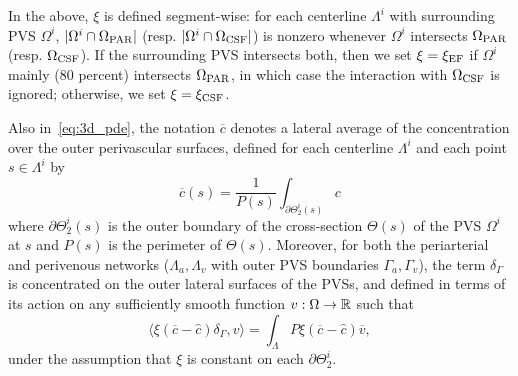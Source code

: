 \documentclass[fleqn,10pt]{wlscirep}
\begin{document}
In the above, $\xi$ is defined segment-wise: for each centerline $\Lambda^i$ with surrounding PVS $\Omega^i$, $|\Omega^i \cap \Omega_{\rm{PAR}}|$ (resp. $|\Omega^i \cap \Omega_{\rm{CSF}}|$) is nonzero whenever $\Omega^i$ intersects $\Omega_{\rm{PAR}}$ (resp. $\Omega_{\rm{CSF}}$). If the surrounding PVS intersects both, then we set $\xi = \xi_{\rm EF}$ if $\Omega^i$ mainly ($80$ percent) intersects $\Omega_{\rm{PAR}}$, in which case the interaction with $\Omega_{\rm{CSF}}$ is ignored; otherwise, we set $\xi = \xi_{\rm CSF}$. 
 
Also in~\eqref{eq:3d_pde}, the notation $\overline{c}$ denotes a lateral average of the concentration over the outer perivascular surfaces, defined for each centerline $\Lambda^i$ and each point $s \in \Lambda^i$ by
\begin{equation*}
  \overline{c}(s) = \frac{1}{P(s)} \int_{\partial \Theta_2^i(s)} c 
\end{equation*}
where $\partial \Theta_2^i(s)$ is the outer boundary of the cross-section $\Theta(s)$ of the PVS $\Omega^i$ at $s$ and $P(s)$ is the perimeter of $\Theta(s)$. Moreover, for both the periarterial and perivenous networks ($\Lambda_a, \Lambda_v$ with outer PVS boundaries $\Gamma_a, \Gamma_v$), the term $\delta_\Gamma$ is concentrated on the outer lateral surfaces of the PVSs, and defined in terms of its action on any sufficiently smooth function $v : \Omega \rightarrow \mathbb{R}$
such that
\begin{equation*}
  \langle \xi (\overline{c} - \hat c ) \delta_\Gamma, v \rangle =
  \int_{\Lambda} P \xi (\overline{c} - \hat c ) \overline{v}, 
\end{equation*}
under the assumption that $\xi$ is constant on each $\partial
\Theta_2^i$.
\end{document}
